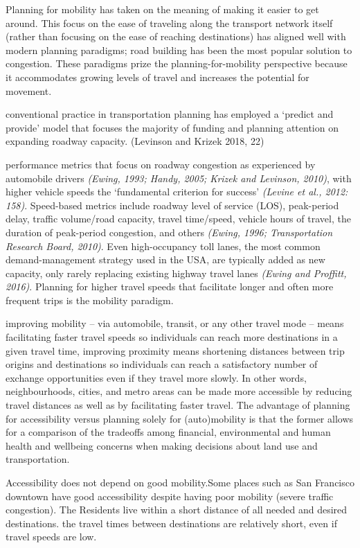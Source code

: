\documentclass[12pt,]{article}
\begin{document}
Planning for mobility has taken on the meaning of making it easier to
get around. This focus on the ease of traveling along the transport
network itself (rather than focusing on the ease of reaching
destinations) has aligned well with modern planning paradigms; road
building has been the most popular solution to congestion. These
paradigms prize the planning-for-mobility perspective because it
accommodates growing levels of travel and increases the potential for
movement.

conventional practice in transportation planning has employed a `predict
and provide' model that focuses the majority of funding and planning
attention on expanding roadway capacity. (Levinson and Krizek 2018, 22)

performance metrics that focus on roadway congestion as experienced by
automobile drivers \emph{(Ewing, 1993; Handy, 2005; Krizek and Levinson,
2010)}, with higher vehicle speeds the `fundamental criterion for
success' \emph{(Levine et al., 2012: 158)}. Speed-based metrics include
roadway level of service (LOS), peak-period delay, traffic volume/road
capacity, travel time/speed, vehicle hours of travel, the duration of
peak-period congestion, and others \emph{(Ewing, 1996; Transportation
Research Board, 2010)}. Even high-occupancy toll lanes, the most common
demand-management strategy used in the USA, are typically added as new
capacity, only rarely replacing existing highway travel lanes
\emph{(Ewing and Proffitt, 2016)}. Planning for higher travel speeds
that facilitate longer and often more frequent trips is the mobility
paradigm.

improving mobility -- via automobile, transit, or any other travel mode
-- means facilitating faster travel speeds so individuals can reach more
destinations in a given travel time, improving proximity means
shortening distances between trip origins and destinations so
individuals can reach a satisfactory number of exchange opportunities
even if they travel more slowly. In other words, neighbourhoods, cities,
and metro areas can be made more accessible by reducing travel distances
as well as by facilitating faster travel. The advantage of planning for
accessibility versus planning solely for (auto)mobility is that the
former allows for a comparison of the tradeoffs among financial,
environmental and human health and wellbeing concerns when making
decisions about land use and transportation.

Accessibility does not depend on good mobility.Some places such as San
Francisco downtown have good accessibility despite having poor mobility
(severe traffic congestion). The Residents live within a short distance
of all needed and desired destinations. the travel times between
destinations are relatively short, even if travel speeds are low.
\end{document}
